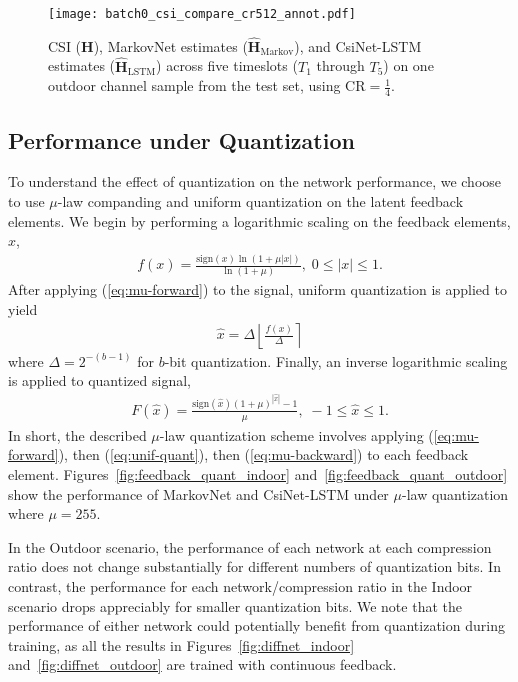 \begin{figure}[htb] \centering 
	\texttt{[image: batch0\_csi\_compare\_cr512\_annot.pdf]}
	\caption{CSI ($\mathbf H$), MarkovNet estimates ($\hat{\mathbf H}_{\text{Markov}}$), and CsiNet-LSTM estimates ($\hat{\mathbf H}_{\text{LSTM}}$) across five timeslots ($T_1$ through $T_5$) on one outdoor channel sample from the test set,
using $\text{CR}=\frac 14$.} 
	\label{fig:csi_image} 
\end{figure}

\subsection{Performance under Quantization}

To understand the effect of quantization on the network performance, we choose to use $\mu$-law companding and uniform quantization on the latent feedback elements. We begin by performing a logarithmic scaling on the feedback elements, $x$,
\begin{align}
	f(x) = \frac{\text{sign}(x)\ln\left(1 + \mu|x|\right)}{\ln\left(1 + \mu\right)} , \; 0 \leq |x| \leq 1. \label{eq:mu-forward}
\end{align}
After applying (\ref{eq:mu-forward}) to the signal, uniform quantization is applied to yield
\begin{align}
	\hat x = \Delta\left\lfloor\frac{f(x)}{\Delta}\right\rceil \label{eq:unif-quant}
\end{align}
where $\Delta = 2^{-(b-1)}$ for $b$-bit quantization. Finally, an inverse logarithmic scaling is applied to quantized signal,
\begin{align}
	F(\hat x) = \frac{\text{sign}(\hat x)\left(1 + \mu\right)^{|\hat x|} - 1}{\mu} , \; -1 \leq \hat x \leq 1. \label{eq:mu-backward}
\end{align}
In short, the described $\mu$-law quantization scheme involves applying (\ref{eq:mu-forward}), then (\ref{eq:unif-quant}), then (\ref{eq:mu-backward}) to each feedback element. Figures~\ref{fig:feedback_quant_indoor} and~\ref{fig:feedback_quant_outdoor} show the performance of MarkovNet and CsiNet-LSTM under $\mu$-law quantization where $\mu=255$.

In the Outdoor scenario, the performance of each network at each compression ratio does not change substantially for different numbers of quantization bits. In contrast, the performance for each network/compression ratio in the Indoor scenario drops appreciably for smaller quantization bits. We note that the performance of either network could potentially benefit from quantization during training, as all the results in Figures~\ref{fig:diffnet_indoor} and~\ref{fig:diffnet_outdoor} are trained with continuous feedback.

